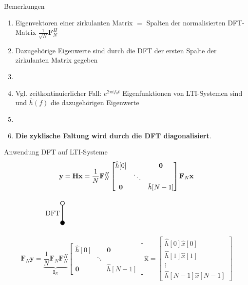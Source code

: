 \documentclass[14pt, aspectratio=169, handout]{beamer}
\newcommand{\verticaltransform}[4]{%
    \begin{tikzpicture}
        \filldraw[thick] (0,0) circle (0.1) node[below=3pt] {$#4$};
        \draw[thick] (0,0.1) -- (0,#2 -0.1) node[midway, left] {#1};
        \draw[thick] (0,#2) circle (0.1) node[above=3pt] {$#3$};
    \end{tikzpicture}%
}
\begin{document}
\begin{frame}{Bemerkungen}
    \begin{enumerate}
    \item Eigenvektoren einer zirkulanten Matrix $=$ Spalten der normalisierten DFT-Matrix $\frac{1}{\sqrt{N}}\mathbf{F}_N^H$
    \item[] Dazugehörige Eigenwerte sind durch die DFT der ersten Spalte der zirkulanten Matrix gegeben
    \item[] 
    \item Vgl. zeitkontinuierlicher Fall: $e^{2 \pi i f_0 t}$ Eigenfunktionen von LTI-Systemen sind und $\hat{h}(f)$ die dazugehörigen Eigenwerte
    \item[] 
    \item \textbf{Die zyklische Faltung wird durch die DFT diagonalisiert}.
\end{enumerate}
\end{frame}

\begin{frame}{Anwendung DFT auf LTI-Systeme}
    $$\vspace*{-0.45cm}\mathbf{y} = \mathbf{H}\mathbf{x} =  \frac{1}{N} \mathbf{F}_N^H  \begin{bmatrix}
    \hat{h}[0] & & \mathbf{0} \\
    & \ddots & \\
    \mathbf{0} & & \hat{h}[N-1]
\end{bmatrix} \mathbf{F}_N \mathbf{x}$$
$$\vspace*{-0.45cm}\verticaltransform{\text{DFT}}{1}{}{} \hspace{7.5cm}$$
$$\mathbf{F}_N \mathbf{y} = \underbrace{\frac{1}{N} \mathbf{F}_N \mathbf{F}_N^H}_{\mathbf{I}_N}  \begin{bmatrix}
    \hat{h}[0] & & \mathbf{0} \\
    & \ddots & \\
    \mathbf{0} & & \hat{h}[N-1]
\end{bmatrix} \hat{\mathbf{x}} = \begin{bmatrix}
    \hat{h}[0] \hat{x}[0] \\
    \hat{h}[1] \hat{x}[1] \\
    \vdots \\
    \hat{h}[N-1] \hat{x}[N-1]
\end{bmatrix}$$
\end{frame}
\end{document}
